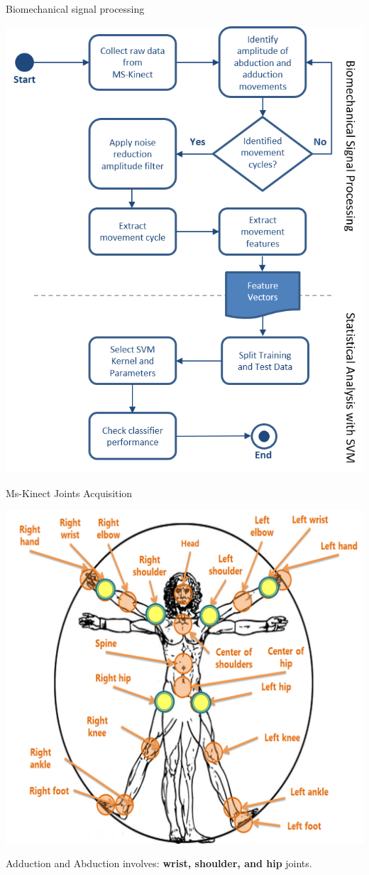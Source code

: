 \documentclass{beamer}
\begin{document}
\begin{frame}{Biomechanical signal processing}
	\begin{block}{}
		\begin{center}
				\includegraphics[height=2.2 in]{img/biomecprocessor2.png}
		\end{center}
	\end{block}
\end{frame}



\begin{frame}{Ms-Kinect Joints Acquisition}
  \begin{block}{}
      \center \includegraphics[height=2.5 in]{img/articulacoes-sel.png}
  \end{block}
	
	\begin{block}{}
	Adduction and Abduction involves: \textbf{wrist, shoulder, and hip} joints.
	\end{block}	
\end{frame}
\end{document}
